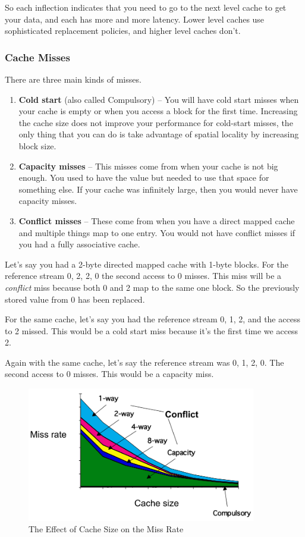 \documentclass{article}
\begin{document}
So each inflection indicates that you need to go to the next level cache to get your data, and each has more and more latency. Lower level caches use sophisticated replacement policies, and higher level caches don't. 

\subsubsection{Cache Misses}

There are three main kinds of misses.

\begin{enumerate}
\item \textbf{Cold start} (also called Compulsory) -- You will have cold start misses when your cache is empty or when you access a block for the first time. Increasing the cache size does not improve your performance for cold-start misses, the only thing that you can do is take advantage of spatial locality by increasing block size. 

\item \textbf{Capacity misses} -- This misses come from when your cache is not big enough. You used to have the value but needed to use that space for something else. If your cache was infinitely large, then you would never have capacity misses. 

\item \textbf{Conflict misses} -- These come from when you have a direct mapped cache and multiple things map to one entry. You would not have conflict misses if you had a fully associative cache. 
\end{enumerate}

Let's say you had a 2-byte directed mapped cache with 1-byte blocks. For the reference stream 0, 2, 2, 0 the second access to 0 misses. This miss will be a \textit{conflict} miss because both 0 and 2 map to the same one block. So the previously stored value from 0 has been replaced.

For the same cache, let's say you had the reference stream 0, 1, 2, and the access to 2 missed. This would be a cold start miss because it's the first time we access 2.

Again with the same cache, let's say the reference stream was 0, 1, 2, 0. The second access to 0 misses. This would be a capacity miss. 

\begin{figure}[H]
\centering
\includegraphics[width=100mm]{img/misses.png}
\caption{The Effect of Cache Size on the Miss Rate}
\end{figure}
\end{document}
